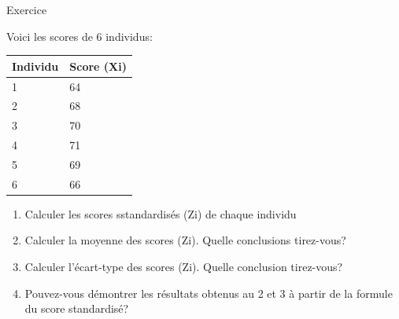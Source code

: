 \documentclass[ignorenonframetext,]{beamer}
\providecommand{\tightlist}{%
  \setlength{\itemsep}{0pt}\setlength{\parskip}{0pt}}
\begin{document}
\begin{frame}{Exercice}

Voici les scores de 6 individus:

\begin{longtable}[]{@{}ll@{}}
\toprule
Individu & Score (Xi)\tabularnewline
\midrule
\endhead
1 & 64\tabularnewline
2 & 68\tabularnewline
3 & 70\tabularnewline
4 & 71\tabularnewline
5 & 69\tabularnewline
6 & 66\tabularnewline
\bottomrule
\end{longtable}

\begin{enumerate}
\def\labelenumi{\arabic{enumi}.}
\tightlist
\item
  Calculer les scores sstandardisés (Zi) de chaque individu
\item
  Calculer la moyenne des scores (Zi). Quelle conclusions tirez-vous?
\item
  Calculer l'écart-type des scores (Zi). Quelle conclusion tirez-vous?
\item
  Pouvez-vous démontrer les résultats obtenus au 2 et 3 à partir de la
  formule du score standardisé?
\end{enumerate}

\end{frame}
\end{document}
